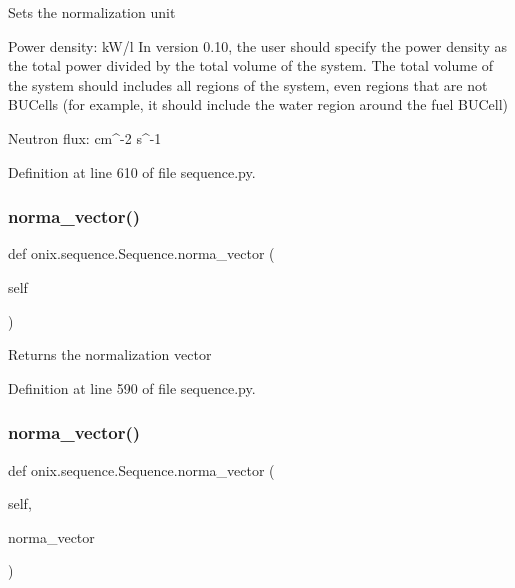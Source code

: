 \begin{DoxyVerb}Sets the normalization unit

Power density: kW/l
In version 0.10, the user should specify the power density as the total power
divided by the total volume of the system. The total volume of the system should includes
all regions of the system, even regions that are not BUCells (for example, it should include
the water region around the fuel BUCell)

Neutron flux: cm^-2 s^-1
\end{DoxyVerb}
 

Definition at line 610 of file sequence.\+py.

\mbox{\label{classonix_1_1sequence_1_1Sequence_a7c65d81c5dd1265034ba6c19c3aa6760}} 
\subsubsection{\texorpdfstring{norma\+\_\+vector()}{norma\_vector()}\hspace{0.1cm}{\footnotesize\ttfamily [1/2]}}
{\footnotesize\ttfamily def onix.\+sequence.\+Sequence.\+norma\+\_\+vector (\begin{DoxyParamCaption}\item[{}]{self }\end{DoxyParamCaption})}

\begin{DoxyVerb}Returns the normalization vector\end{DoxyVerb}
 

Definition at line 590 of file sequence.\+py.

\mbox{\label{classonix_1_1sequence_1_1Sequence_a19e647f8872e99c45940874da5d2ec58}} 
\subsubsection{\texorpdfstring{norma\+\_\+vector()}{norma\_vector()}\hspace{0.1cm}{\footnotesize\ttfamily [2/2]}}
{\footnotesize\ttfamily def onix.\+sequence.\+Sequence.\+norma\+\_\+vector (\begin{DoxyParamCaption}\item[{}]{self,  }\item[{}]{norma\+\_\+vector }\end{DoxyParamCaption})}


